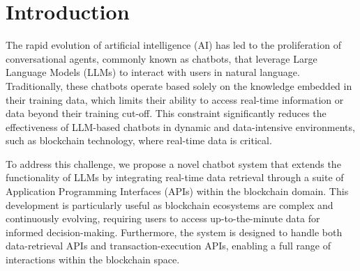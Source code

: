 \documentclass[runningheads]{llncs}
\begin{document}
\section{Introduction}
The rapid evolution of artificial intelligence (AI) has led to the proliferation of conversational agents, commonly known as chatbots, that leverage Large Language Models (LLMs) to interact with users in natural language. Traditionally, these chatbots operate based solely on the knowledge embedded in their training data, which limits their ability to access real-time information or data beyond their training cut-off. This constraint significantly reduces the effectiveness of LLM-based chatbots in dynamic and data-intensive environments, such as blockchain technology, where real-time data is critical.

To address this challenge, we propose a novel chatbot system that extends the functionality of LLMs by integrating real-time data retrieval through a suite of Application Programming Interfaces (APIs) within the blockchain domain. This development is particularly useful as blockchain ecosystems are complex and continuously evolving, requiring users to access up-to-the-minute data for informed decision-making. Furthermore, the system is designed to handle both data-retrieval APIs and transaction-execution APIs, enabling a full range of interactions within the blockchain space.

\end{document}
